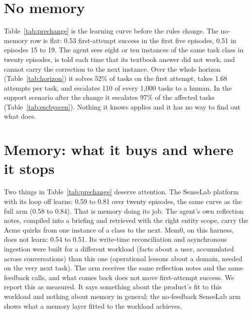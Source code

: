 \documentclass[11pt]{article}
\begin{document}
\section{No memory}
\label{sec:nomemory}

Table~\ref{tab:prechange} is the learning curve before the rules change. The no-memory row is
flat: 0.53 first-attempt success in the first five episodes, 0.51 in episodes 15 to 19. The
agent sees eight or ten instances of the same task class in twenty episodes, is told each time
that its textbook answer did not work, and cannot carry the correction to the next instance.
Over the whole horizon (Table~\ref{tab:horizon}) it solves 52\% of tasks on the first attempt,
takes 1.68 attempts per task, and escalates 110 of every 1{,}000 tasks to a human. In the
support scenario after the change it escalates 97\% of the affected tasks
(Table~\ref{tab:escbyscen}). Nothing it knows applies and it has no way to find out what does.

\begin{table}[H]
\centering\scriptsize
{}
\caption{Before the change: first-attempt success on all tasks by 5-episode block, episodes 0--19.}
\label{tab:prechange}
\end{table}


\section{Memory: what it buys and where it stops}
\label{sec:memory}

Two things in Table~\ref{tab:prechange} deserve attention. The SenseLab platform with its loop
off learns: 0.59 to 0.81 over twenty episodes, the same curve as the full arm (0.58 to 0.84).
That is memory doing its job. The agent's own reflection notes, compiled into a briefing and
retrieved with the right entity scope, carry the Acme quirks from one instance of a class to
the next. Mem0, on this harness, does not learn: 0.54 to 0.51. Its write-time reconciliation
and asynchronous ingestion were built for a different workload (facts about a user,
accumulated across conversations) than this one (operational lessons about a domain, needed on
the very next task). The arm receives the same reflection notes and the same feedback calls,
and what comes back does not move first-attempt success. We report this as measured. It says
something about the product's fit to this workload and nothing about memory in general; the
no-feedback SenseLab arm shows what a memory layer fitted to the workload achieves.
\end{document}
